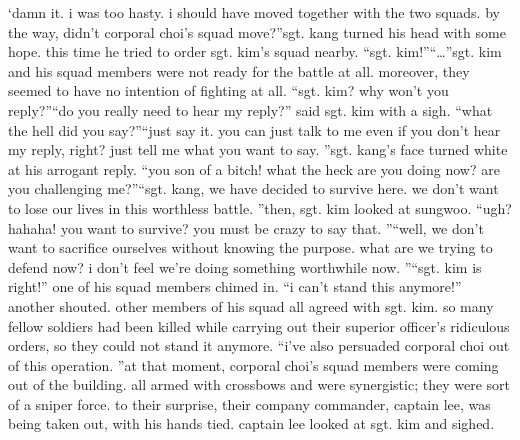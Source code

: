 ‘damn it.
 i was too hasty.
 i should have moved together with the two squads.
 by the way, didn’t corporal choi’s squad move?”sgt.
 kang turned his head with some hope.
 this time he tried to order sgt.
 kim’s squad nearby.
“sgt.
 kim!”“…”sgt.
 kim and his squad members were not ready for the battle at all.
 moreover, they seemed to have no intention of fighting at all.
“sgt.
 kim? why won’t you reply?”“do you really need to hear my reply?” said sgt.
 kim with a sigh.
“what the hell did you say?”“just say it.
 you can just talk to me even if you don’t hear my reply, right? just tell me what you want to say.
”sgt.
 kang’s face turned white at his arrogant reply.
“you son of a bitch! what the heck are you doing now? are you challenging me?”“sgt.
 kang, we have decided to survive here.
 we don’t want to lose our lives in this worthless battle.
”then, sgt.
 kim looked at sungwoo.
“ugh? hahaha! you want to survive? you must be crazy to say that.
”“well, we don’t want to sacrifice ourselves without knowing the purpose.
 what are we trying to defend now? i don’t feel we’re doing something worthwhile now.
”“sgt.
 kim is right!” one of his squad members chimed in.
“i can’t stand this anymore!” another shouted.
other members of his squad all agreed with sgt.
 kim.
 so many fellow soldiers had been killed while carrying out their superior officer’s ridiculous orders, so they could not stand it anymore.
“i’ve also persuaded corporal choi out of this operation.
”at that moment, corporal choi’s squad members were coming out of the building.
 all armed with crossbows and were synergistic; they were sort of a sniper force.
to their surprise, their company commander, captain lee, was being taken out, with his hands tied.
 captain lee looked at sgt.
 kim and sighed.


 